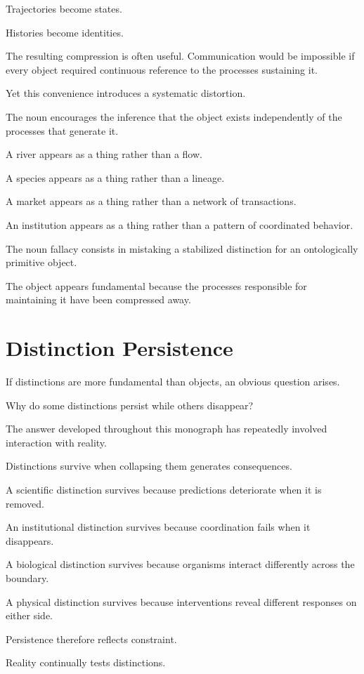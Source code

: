 \documentclass[11pt,oneside,openany]{book}
\begin{document}
Trajectories become states.

Histories become identities.

The resulting compression is often useful. Communication would be impossible if every object required continuous reference to the processes sustaining it.

Yet this convenience introduces a systematic distortion.

The noun encourages the inference that the object exists independently of the processes that generate it.

A river appears as a thing rather than a flow.

A species appears as a thing rather than a lineage.

A market appears as a thing rather than a network of transactions.

An institution appears as a thing rather than a pattern of coordinated behavior.

The noun fallacy consists in mistaking a stabilized distinction for an ontologically primitive object.

The object appears fundamental because the processes responsible for maintaining it have been compressed away.

\section{Distinction Persistence}

If distinctions are more fundamental than objects, an obvious question arises.

Why do some distinctions persist while others disappear?

The answer developed throughout this monograph has repeatedly involved interaction with reality.

Distinctions survive when collapsing them generates consequences.

A scientific distinction survives because predictions deteriorate when it is removed.

An institutional distinction survives because coordination fails when it disappears.

A biological distinction survives because organisms interact differently across the boundary.

A physical distinction survives because interventions reveal different responses on either side.

Persistence therefore reflects constraint.

Reality continually tests distinctions.
\end{document}
